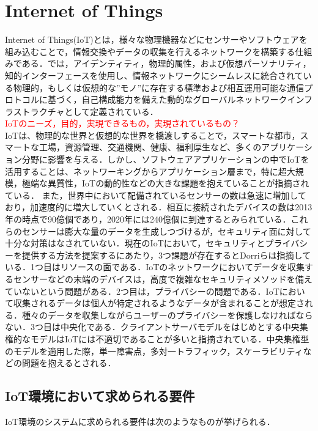 \documentclass[japanese, macos]{KU2}
\begin{document}
\section{Internet of Things}
Internet of Things(IoT)とは，様々な物理機器などにセンサーやソフトウェアを組み込むことで，情報交換やデータの収集を行えるネットワークを構築する仕組みである．\cite{Vermesan2009}では，アイデンティティ，物理的属性，および仮想パーソナリティ，知的インターフェースを使用し、情報ネットワークにシームレスに統合されている物理的，もしくは仮想的な”モノ”に存在する標準および相互運用可能な通信プロトコルに基づく，自己構成能力を備えた動的なグローバルネットワークインフラストラクチャとして定義されている．\\
\textcolor{red}{IoTのニーズ，目的，実現できるもの，実現されているもの？}\\
IoTは、物理的な世界と仮想的な世界を橋渡しすることで，スマートな都市，スマートな工場，資源管理、交通機関、健康、福利厚生など、多くのアプリケーション分野に影響を与える．しかし、ソフトウェアアプリケーションの中でIoTを活用することは、ネットワーキングからアプリケーション層まで，特に超大規模，極端な異質性，IoTの動的性などの大きな課題を抱えていることが指摘されている\cite{Bouloukakis2016}．
また，世界中において配備されているセンサーの数は急速に増加しており，加速度的に増大していくとされる．相互に接続されたデバイスの数は2013年の時点で90億個であり，2020年には240億個に到達するとみられている\cite{gubbi2013internet}．これらのセンサーは膨大な量のデータを生成しつづけるが，セキュリティ面に対して十分な対策はなされていない．現在のIoTにおいて，セキュリティとプライバシーを提供する方法を提案するにあたり，3つ課題が存在するとDorriら\cite{dorri2017towards}は指摘している．1つ目はリソースの面である．IoTのネットワークにおいてデータを収集するセンサーなどの末端のデバイスは，高度で複雑なセキュリティメソッドを備えていないという問題がある．2つ目は，プライバシーの問題である．IoTにおいて収集されるデータは個人が特定されるようなデータが含まれることが想定される．種々のデータを収集しながらユーザーのプライバシーを保護しなければならない．3つ目は中央化である．クライアントサーバモデルをはじめとする中央集権的なモデルはIoTには不適切であることが多いと指摘されている．中央集権型のモデルを適用した際，単一障害点，多対一トラフィック，スケーラビリティなどの問題を抱えるとされる．\\

\subsection{IoT環境において求められる要件}
IoT環境のシステムに求められる要件は次のようなものが挙げられる．
\end{document}
